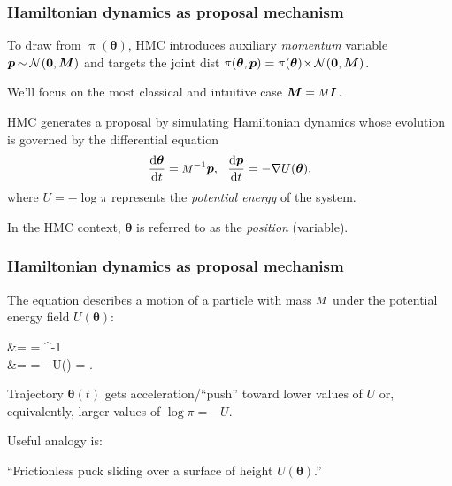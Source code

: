 \documentclass[18pt]{beamer}
\newcommand{\defineWithinItemizeSpacing}{%
	\setlength{\abovedisplayskip}{.3\baselineskip}%
	\setlength{\belowdisplayskip}{.3\baselineskip}%
}
\newenvironment{itemizedEquation*}{%
	\defineWithinItemizeSpacing%
	\begin{equation*}
}{
	\end{equation*} \ignorespacesafterend
}
\newcommand{\smallCap}[1]{{\small \MakeUppercase{#1}}}
\newcommand{\diff}{\operatorname{\mathrm{d}}\!{}}
\newcommand{\negthinnerspace}{\mskip-.5\thinmuskip}
\newcommand{\normalDist}{\mathcal{N}}
\newcommand{\momentum}{p}
\newcommand{\bmomentum}{\bm{\momentum}}
\newcommand{\mass}{\scalebox{.85}{$M$}}
\newcommand{\bmass}{\bm{M}}
\newcommand{\potential}{U}
\DeclareMathOperator{\density}{\pi}
\newcommand{\bparam}{\bm{\theta}}
\begin{document}
\renewcommand{\frametitleText}{Hamiltonian dynamics as proposal mechanism}
\begin{frame}
\frametitle{\frametitleText}
To draw from $\density(\bparam)$, \smallCap{hmc} introduces auxiliary \textit{momentum} variable $\bmomentum \negthinnerspace \sim \negthinnerspace \normalDist(\bm{0}, \bmass)$ and targets the joint dist $\density(\bparam, \bmomentum) = \density(\bparam) \negthinspace \times \negthinnerspace \normalDist(\bm{0}, \bmass)$.

We'll focus on the most classical and intuitive case $\bmass = \mass \bm{I}$.

\pause%
\medskip
H\smallCap{mc} generates a proposal by simulating Hamiltonian dynamics whose evolution is governed by the differential equation
\begin{equation*}
\label{eq:hamilton}
\setlength{\abovedisplayskip}{.4\baselineskip}%
\setlength{\belowdisplayskip}{.4\baselineskip}%
\frac{\diff \bparam}{\diff t}
	= \mass^{-1} \bmomentum, \ \
\frac{\diff \bmomentum}{\diff t}
	= - \nabla \potential(\bparam),
\end{equation*}
where $\potential = - \log \pi$ represents the \textit{potential energy} of the system.

\pause%
\medskip
In the \smallCap{hmc} context, $\bparam$ is referred to as the \textit{position} (variable).

\end{frame}


\begin{frame}
\frametitle{\frametitleText}

The equation describes a motion of a particle with mass $\mass$ under the potential energy field $\potential(\bparam)$:
\begin{itemizedEquation*}
\hspace*{-1em}
\begin{aligned}
	&= \frac{\diff \bparam}{\diff t} 
	= \mass^{-1} \bmomentum
	\\
	&= \frac{\diff \bmomentum}{\diff t} 
	= - \nabla \potential (\bparam) 
	= .
\end{aligned}
\end{itemizedEquation*}

\pause%
\medskip
Trajectory $\bparam(t)$ gets acceleration/``push'' toward lower values of $\potential$ or, equivalently, larger values of $\log \pi = - \potential$.

\pause%
\medskip
Useful analogy is:

\centerline{``Frictionless puck sliding over a surface of height $\potential(\bparam)$.''}
\end{frame}
\end{document}
